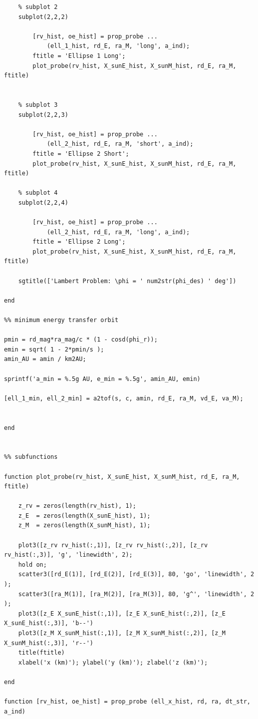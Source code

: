 \documentclass[conf]{new-aiaa}
\begin{document}
\begin{lstlisting}
    % subplot 2 
    subplot(2,2,2) 

        [rv_hist, oe_hist] = prop_probe ... 
            (ell_1_hist, rd_E, ra_M, 'long', a_ind); 
        ftitle = 'Ellipse 1 Long'; 
        plot_probe(rv_hist, X_sunE_hist, X_sunM_hist, rd_E, ra_M, ftitle) 
    

    % subplot 3 
    subplot(2,2,3) 
    
        [rv_hist, oe_hist] = prop_probe ... 
            (ell_2_hist, rd_E, ra_M, 'short', a_ind);         
        ftitle = 'Ellipse 2 Short'; 
        plot_probe(rv_hist, X_sunE_hist, X_sunM_hist, rd_E, ra_M, ftitle) 

    % subplot 4 
    subplot(2,2,4) 
    
        [rv_hist, oe_hist] = prop_probe ... 
            (ell_2_hist, rd_E, ra_M, 'long', a_ind);         
        ftitle = 'Ellipse 2 Long'; 
        plot_probe(rv_hist, X_sunE_hist, X_sunM_hist, rd_E, ra_M, ftitle) 

    sgtitle(['Lambert Problem: \phi = ' num2str(phi_des) ' deg'])
    
end 

%% minimum energy transfer orbit 

pmin = rd_mag*ra_mag/c * (1 - cosd(phi_r)); 
emin = sqrt( 1 - 2*pmin/s ); 
amin_AU = amin / km2AU; 

sprintf('a_min = %.5g AU, e_min = %.5g', amin_AU, emin)

[ell_1_min, ell_2_min] = a2tof(s, c, amin, rd_E, ra_M, vd_E, va_M); 


end 


%% subfunctions 

function plot_probe(rv_hist, X_sunE_hist, X_sunM_hist, rd_E, ra_M, ftitle) 

    z_rv = zeros(length(rv_hist), 1); 
    z_E  = zeros(length(X_sunE_hist), 1); 
    z_M  = zeros(length(X_sunM_hist), 1); 

    plot3([z_rv rv_hist(:,1)], [z_rv rv_hist(:,2)], [z_rv rv_hist(:,3)], 'g', 'linewidth', 2); 
    hold on; 
    scatter3([rd_E(1)], [rd_E(2)], [rd_E(3)], 80, 'go', 'linewidth', 2 );
    scatter3([ra_M(1)], [ra_M(2)], [ra_M(3)], 80, 'g^', 'linewidth', 2 ); 
    plot3([z_E X_sunE_hist(:,1)], [z_E X_sunE_hist(:,2)], [z_E X_sunE_hist(:,3)], 'b--')
    plot3([z_M X_sunM_hist(:,1)], [z_M X_sunM_hist(:,2)], [z_M X_sunM_hist(:,3)], 'r--')
    title(ftitle)
    xlabel('x (km)'); ylabel('y (km)'); zlabel('z (km)'); 

end 

function [rv_hist, oe_hist] = prop_probe (ell_x_hist, rd, ra, dt_str, a_ind)


\end{lstlisting}
\end{document}
